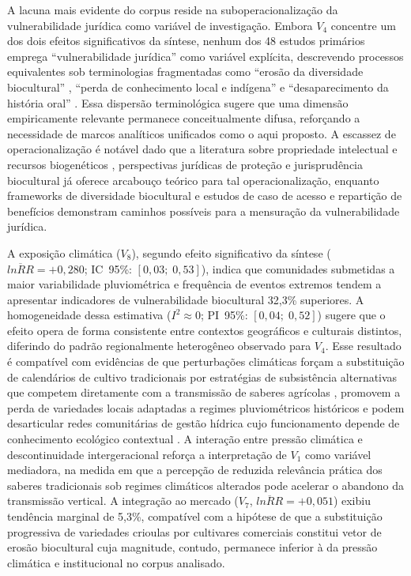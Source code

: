 \documentclass[12pt,a4paper]{article}
\begin{document}
A lacuna mais evidente do corpus reside na suboperacionalização da vulnerabilidade jurídica como variável de investigação. Embora $V_4$ concentre um dos dois efeitos significativos da síntese, nenhum dos 48 estudos primários emprega ``vulnerabilidade jurídica'' como variável explícita, descrevendo processos equivalentes sob terminologias fragmentadas como ``erosão da diversidade biocultural'' \citep{Mobarak2025}, ``perda de conhecimento local e indígena'' \citep{Suwardi2025} e ``desaparecimento da história oral'' \citep{LaRosa2021}. Essa dispersão terminológica sugere que uma dimensão empiricamente relevante permanece conceitualmente difusa, reforçando a necessidade de marcos analíticos unificados como o aqui proposto. A escassez de operacionalização é notável dado que a literatura sobre propriedade intelectual e recursos biogenéticos \citep{Dutfield2004}, perspectivas jurídicas de proteção \citep{Cottier2004} e jurisprudência biocultural \citep{BavikatteRobinson2011} já oferece arcabouço teórico para tal operacionalização, enquanto frameworks de diversidade biocultural \citep{Nemoga2022} e estudos de caso de acesso e repartição de benefícios \citep{Robinson2014} demonstram caminhos possíveis para a mensuração da vulnerabilidade jurídica.

A exposição climática ($V_8$), segundo efeito significativo da síntese ($\overline{lnRR} = +0{,}280$; IC~95\%: $[0{,}03;\; 0{,}53]$), indica que comunidades submetidas a maior variabilidade pluviométrica e frequência de eventos extremos tendem a apresentar indicadores de vulnerabilidade biocultural 32,3\% superiores. A homogeneidade dessa estimativa ($I^2 \approx 0$; PI~95\%: $[0{,}04;\; 0{,}52]$) sugere que o efeito opera de forma consistente entre contextos geográficos e culturais distintos, diferindo do padrão regionalmente heterogêneo observado para $V_4$. Esse resultado é compatível com evidências de que perturbações climáticas forçam a substituição de calendários de cultivo tradicionais por estratégias de subsistência alternativas que competem diretamente com a transmissão de saberes agrícolas \citep{Aniah2019}, promovem a perda de variedades locais adaptadas a regimes pluviométricos históricos \citep{Savo2016} e podem desarticular redes comunitárias de gestão hídrica cujo funcionamento depende de conhecimento ecológico contextual \citep{Tran2025}. A interação entre pressão climática e descontinuidade intergeracional reforça a interpretação de $V_1$ como variável mediadora, na medida em que a percepção de reduzida relevância prática dos saberes tradicionais sob regimes climáticos alterados pode acelerar o abandono da transmissão vertical. A integração ao mercado ($V_7$, $\overline{lnRR} = +0{,}051$) exibiu tendência marginal de 5,3\%, compatível com a hipótese de que a substituição progressiva de variedades crioulas por cultivares comerciais \citep{ReyesGarcia2013} constitui vetor de erosão biocultural cuja magnitude, contudo, permanece inferior à da pressão climática e institucional no corpus analisado.
\end{document}
